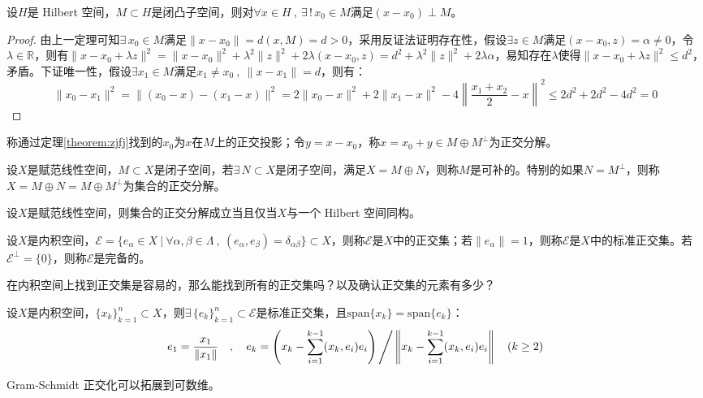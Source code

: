 \begin{theorem}\label{theorem:zjfj}
设$H$是 Hilbert 空间，$M \subset H$是闭凸子空间，则对$\forall x \in H \ , \ \exists \, ! \, x_0 \in M$满足$(x-x_0) \perp M$。
\end{theorem}
\begin{proof}
由上一定理可知$\exists \, x_0 \in M$满足$\|x-x_0\|=d(x,M)=d>0$，采用反证法证明存在性，假设$\exists z \in M$满足$(x-x_0,z)=\alpha \neq 0$，令$\lambda \in \mathbb{R}$，则有$\|x-x_0+\lambda z\|^2=\|x-x_0\|^2+\lambda^2\|z\|^2+2\lambda(x-x_0,z)=d^2+\lambda^2\|z\|^2+2\lambda\alpha$，易知存在$\lambda$使得$\|x-x_0+\lambda z\|^2 \leq d^2$，矛盾。下证唯一性，假设$\exists x_1 \in M$满足$x_1 \neq x_0 \ , \ \|x-x_1\|=d$，则有：
\[\|x_0-x_1\|^2=\|(x_0-x)-(x_1-x)\|^2=2\|x_0-x\|^2+2\|x_1-x\|^2-4\left\|\frac{x_1+x_2}{2}-x\right\|^2\leq 2d^2+2d^2-4d^2=0\]
\end{proof}

\begin{definition}
称通过定理\ref{theorem:zjfj}找到的$x_0$为$x$在$M$上的正交投影；令$y=x-x_0$，称$x=x_0+y \in M \oplus M^{\perp}$为正交分解。
\end{definition}

\begin{definition}
设$X$是赋范线性空间，$M \subset X$是闭子空间，若$\exists \, N \subset X$是闭子空间，满足$X=M \oplus N$，则称$M$是可补的。特别的如果$N=M^{\perp}$，则称$X=M \oplus N=M \oplus M^{\perp}$为集合的正交分解。
\end{definition}

\begin{theorem}
设$X$是赋范线性空间，则集合的正交分解成立当且仅当$X$与一个 Hilbert 空间同构。
\end{theorem}

\begin{definition}[正交集/系]
设$X$是内积空间，$\mathscr{E}=\{e_{\alpha} \in X\ | \ \forall \alpha,\beta \in  \Lambda \ , \ (e_{\alpha},e_{\beta})=\delta_{\alpha\beta}\} \subset X$，则称$\mathscr{E}$是$X$中的正交集；若$\|e_{\alpha}\|=1$，则称$\mathscr{E}$是$X$中的标准正交集。若$\mathscr{E}^{\perp}=\{0\}$，则称$\mathscr{E}$是完备的。
\end{definition}
在内积空间上找到正交集是容易的，那么能找到所有的正交集吗？以及确认正交集的元素有多少？

\begin{theorem}
设$X$是内积空间，$\{x_k\}_{k=1}^n \subset X$，则$\exists \, \{e_k\}_{k=1}^n \subset \mathscr{E}$是标准正交集，且$\text{span}\{x_k\}=\text{span}\{e_k\}$：
\[e_1=\frac{x_1}{\|x_1\|} \quad , \quad e_k=\left(x_k-\sum_{i=1}^{k-1}(x_k,e_i)e_i\right)\Bigg{/}\left\|x_k-\sum_{i=1}^{k-1}(x_k,e_i)e_i\right\| \quad (k \geq 2)\]
\end{theorem}
\begin{remark}
\quad Gram-Schmidt 正交化可以拓展到可数维。
\end{remark}

